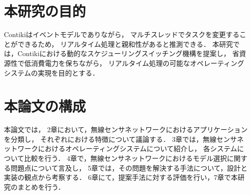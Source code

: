 \section{本研究の目的}
Contikiはイベントモデルでありながら，
マルチスレッドでタスクを変更することができるため，
リアルタイム処理と親和性があると推測できる．
本研究では，Contikiにおける動的なスケジューリングスイッチング機構を提案し，
省資源性で低消費電力を保ちながら，
リアルタイム処理の可能なオペレーティングシステムの実現を目的とする．



\section{本論文の構成}

本論文では，
2章において，無線センサネットワークにおけるアプリケーションを分類し，
それぞれにおける特徴について議論する．
3章では，無線センサネットワークにおけるオペレーティングシステムについて紹介し，
各システムについて比較を行う．
4章で，無線センサネットワークにおけるモデル選択に関する問題点について言及し，
5章では，その問題を解決する手法について，設計と実装の観点から考察する．
6章にて，提案手法に対する評価を行い，7章で本研究のまとめを行う．

